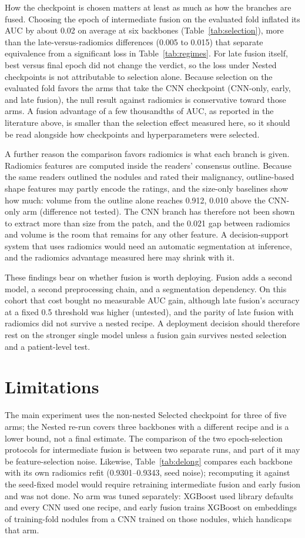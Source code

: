 \documentclass[conference]{IEEEtran}
\begin{document}
How the checkpoint is chosen matters at least as much as how the branches are fused. Choosing the epoch of intermediate fusion on the evaluated fold inflated its AUC by about 0.02 on average at six backbones (Table~\ref{tab:selection}), more than the late-versus-radiomics differences (0.005 to 0.015) that separate equivalence from a significant loss in Table~\ref{tab:regimes}. For late fusion itself, best versus final epoch did not change the verdict, so the loss under Nested checkpoints is not attributable to selection alone. Because selection on the evaluated fold favors the arms that take the CNN checkpoint (CNN-only, early, and late fusion), the null result against radiomics is conservative toward those arms. A fusion advantage of a few thousandths of AUC, as reported in the literature above, is smaller than the selection effect measured here, so it should be read alongside how checkpoints and hyperparameters were selected.

A further reason the comparison favors radiomics is what each branch is given. Radiomics features are computed inside the readers' consensus outline. Because the same readers outlined the nodules and rated their malignancy, outline-based shape features may partly encode the ratings, and the size-only baselines show how much: volume from the outline alone reaches 0.912, 0.010 above the CNN-only arm (difference not tested). The CNN branch has therefore not been shown to extract more than size from the patch, and the 0.021 gap between radiomics and volume is the room that remains for any other feature. A decision-support system that uses radiomics would need an automatic segmentation at inference, and the radiomics advantage measured here may shrink with it.

These findings bear on whether fusion is worth deploying. Fusion adds a second model, a second preprocessing chain, and a segmentation dependency. On this cohort that cost bought no measurable AUC gain, although late fusion's accuracy at a fixed 0.5 threshold was higher (untested), and the parity of late fusion with radiomics did not survive a nested recipe. A deployment decision should therefore rest on the stronger single model unless a fusion gain survives nested selection and a patient-level test.

\section{Limitations}\label{sec:limitations}
The main experiment uses the non-nested Selected checkpoint for three of five arms; the Nested re-run covers three backbones with a different recipe and is a lower bound, not a final estimate. The comparison of the two epoch-selection protocols for intermediate fusion is between two separate runs, and part of it may be feature-selection noise. Likewise, Table~\ref{tab:delong} compares each backbone with its own radiomics refit (0.9301--0.9343, seed noise); recomputing it against the seed-fixed model would require retraining intermediate fusion and early fusion and was not done. No arm was tuned separately: XGBoost used library defaults and every CNN used one recipe, and early fusion trains XGBoost on embeddings of training-fold nodules from a CNN trained on those nodules, which handicaps that arm.
\end{document}
